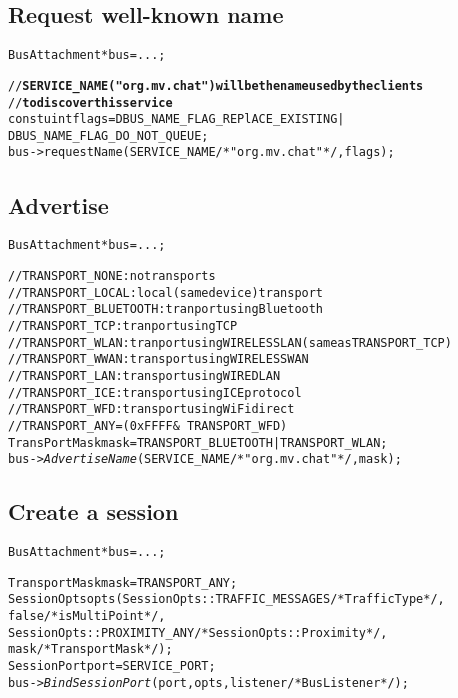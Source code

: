 \documentclass{note}
\begin{document}
\subsection*{Request well-known name}
\begin{alltt}
  BusAttachment *bus = ...;

  // {\bf SERVICE_NAME ("org.mv.chat") will be the name used by the clients}
  // {\bf to discover this service}
  const uint flags = DBUS_NAME_FLAG_REPlACE_EXISTING |
                     DBUS_NAME_FLAG_DO_NOT_QUEUE;
  bus->requestName(SERVICE_NAME /* "org.mv.chat" */, flags);
\end{alltt}

\subsection*{Advertise}
\begin{alltt}
  BusAttachment *bus = ...;
  
  // TRANSPORT_NONE: no transports
  // TRANSPORT_LOCAL: local (same device) transport
  // TRANSPORT_BLUETOOTH: tranport using Bluetooth
  // TRANSPORT_TCP: tranport using TCP 
  // TRANSPORT_WLAN: tranport using WIRELESS LAN (same as TRANSPORT_TCP)
  // TRANSPORT_WWAN: transport using WIRELESS WAN
  // TRANSPORT_LAN: transport using WIRED LAN
  // TRANSPORT_ICE: transport using ICE protocol
  // TRANSPORT_WFD: transport using WiFi direct
  // TRANSPORT_ANY = (0xFFFF & ~TRANSPORT_WFD)
  TransPortMask mask = TRANSPORT_BLUETOOTH | TRANSPORT_WLAN;
  bus->{\tt{}\em{}AdvertiseName}(SERVICE_NAME /* "org.mv.chat" */, mask);
\end{alltt}

\subsection*{Create a session}
\begin{alltt}
  BusAttachment *bus = ...;

  TransportMask mask = TRANSPORT_ANY;
  SessionOpts opts(SessionOpts::TRAFFIC_MESSAGES /* TrafficType */,
                   false                         /* isMultiPoint */,
                   SessionOpts::PROXIMITY_ANY    /* SessionOpts::Proximity */,
                   mask                          /* TransportMask */);
  SessionPort port = SERVICE_PORT;
  bus->{\em{}BindSessionPort}(port, opts, listener /* BusListener */);
\end{alltt}
\end{document}
